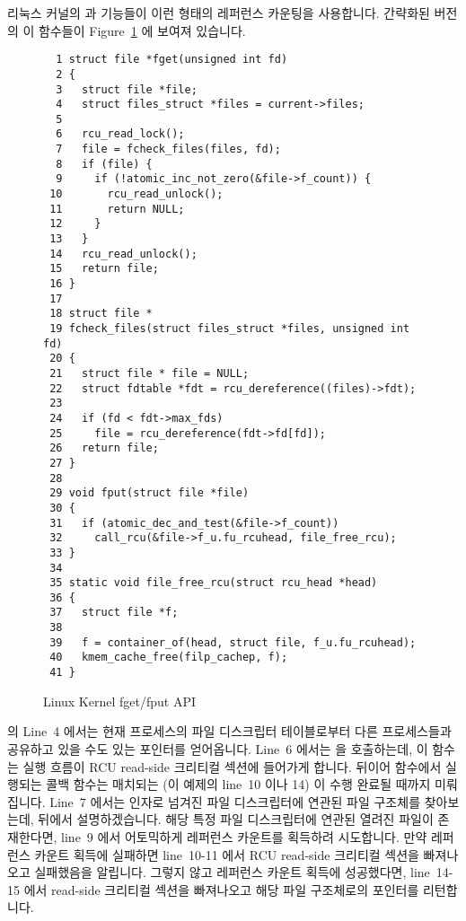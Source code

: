리눅스 커널의  과  기능들이 이런 형태의 레퍼런스 카운팅을
사용합니다.
간략화된 버전의 이 함수들이
Figure~\ref{fig:defer:Linux Kernel fget/fput API} 에 보여져 있습니다.
\iffalse

The Linux kernel's \co{fget()} and \co{fput()} primitives
use this style of reference counting.
Simplified versions of these functions are shown in
Figure~\ref{fig:defer:Linux Kernel fget/fput API}.
\fi

\begin{figure}[htbp]
{ \scriptsize
\begin{verbatim}
  1 struct file *fget(unsigned int fd)
  2 {
  3   struct file *file;
  4   struct files_struct *files = current->files;
  5
  6   rcu_read_lock();
  7   file = fcheck_files(files, fd);
  8   if (file) {
  9     if (!atomic_inc_not_zero(&file->f_count)) {
 10       rcu_read_unlock();
 11       return NULL;
 12     }
 13   }
 14   rcu_read_unlock();
 15   return file;
 16 }
 17
 18 struct file *
 19 fcheck_files(struct files_struct *files, unsigned int fd)
 20 {
 21   struct file * file = NULL;
 22   struct fdtable *fdt = rcu_dereference((files)->fdt);
 23
 24   if (fd < fdt->max_fds)
 25     file = rcu_dereference(fdt->fd[fd]);
 26   return file;
 27 }
 28
 29 void fput(struct file *file)
 30 {
 31   if (atomic_dec_and_test(&file->f_count))
 32     call_rcu(&file->f_u.fu_rcuhead, file_free_rcu);
 33 }
 34
 35 static void file_free_rcu(struct rcu_head *head)
 36 {
 37   struct file *f;
 38
 39   f = container_of(head, struct file, f_u.fu_rcuhead);
 40   kmem_cache_free(filp_cachep, f);
 41 }
\end{verbatim}
}
\caption{Linux Kernel fget/fput API}
\label{fig:defer:Linux Kernel fget/fput API}
\end{figure}

 의 Line~4 에서는 현재 프로세스의 파일 디스크립터 테이블로부터 다른
프로세스들과 공유하고 있을 수도 있는 포인터를 얻어옵니다.
Line~6 에서는  을 호출하는데, 이 함수는 실행 흐름이 RCU
read-side 크리티컬 섹션에 들어가게 합니다.
뒤이어  함수에서 실행되는 콜백 함수는 매치되는
 (이 예제의 line~10 이나 14) 이 수행 완료될 때까지
미뤄집니다.
Line~7 에서는  인자로 넘겨진 파일 디스크립터에 연관된 파일 구조체를
찾아보는데, 뒤에서 설명하겠습니다.
해당 특정 파일 디스크립터에 연관된 열려진 파일이 존재한다면, line~9 에서
어토믹하게 레퍼런스 카운트를 획득하려 시도합니다.
만약 레퍼런스 카운트 획득에 실패하면 line~10-11 에서 RCU read-side 크리티컬
섹션을 빠져나오고 실패했음을 알립니다.
그렇지 않고 레퍼런스 카운트 획득에 성공했다면, line~14-15 에서 read-side
크리티컬 섹션을 빠져나오고 해당 파일 구조체로의 포인터를 리턴합니다.
\iffalse


